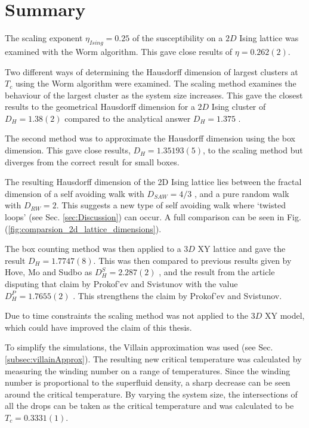 \section{Summary}
\label{sec:Summary}

The scaling exponent $\eta_{Ising} = 0.25$ of the susceptibility on a $2D$ Ising lattice was examined with the Worm algorithm. This gave close results of $\eta = 0.262(2)$.

Two different ways of determining the Hausdorff dimension of largest clusters at $T_c$ using the Worm algorithm were examined. The scaling method examines the behaviour of the largest cluster as the system size increases. This gave the closest results to the geometrical Hausdorff dimension for a $2D$ Ising cluster of $D_H = 1.38(2)$ compared to the analytical answer $D_H = 1.375$ \cite{Duplantier:GeoHausdorff}.

The second method was to approximate the Hausdorff dimension using the box dimension. This gave close results, $D_H = 1.35193(5)$, to the scaling method but diverges from the correct result for small boxes.

The resulting Hausdorff dimension of the 2D Ising lattice lies between the fractal dimension of a self avoiding walk with $D_{SAW} = 4/3$ \cite{Vilgis:FlorySAW}, and a pure random walk with $D_{RW} = 2$. This suggests a new type of self avoiding walk where `twisted loops' (see Sec. \ref{sec:Discussion}) can occur. A full comparison can be seen in Fig. (\ref{fig:comparsion_2d_lattice_dimensions}).

The box counting method was then applied to a $3D$ XY lattice and gave the result $D_H = 1.7747(8)$. This was then compared to previous results given by Hove, Mo and Sudbo as $D_H^S = 2.287(2)$ \cite{Hove:hausdorff_crit_fluctuations}, and the result from the article disputing that claim by Prokof'ev and Svistunov with the value $D_H^P = 1.7655(2)$ \cite{Prokofev:comment_on_hove_hausdorff_crit_fluct}. This strengthens the claim by Prokof'ev and Svistunov.

Due to time constraints the scaling method was not applied to the $3D$ XY model, which could have improved the claim of this thesis.

To simplify the simulations, the Villain approximation was used (see Sec. \ref{subsec:villainApprox}). The resulting new critical temperature was calculated by measuring the winding number on a range of temperatures. Since the winding number is proportional to the superfluid density, a sharp decrease can be seen around the critical temperature. By varying the system size, the intersections of all the drops can be taken as the critical temperature and was calculated to be $T_c = 0.3331(1)$.

